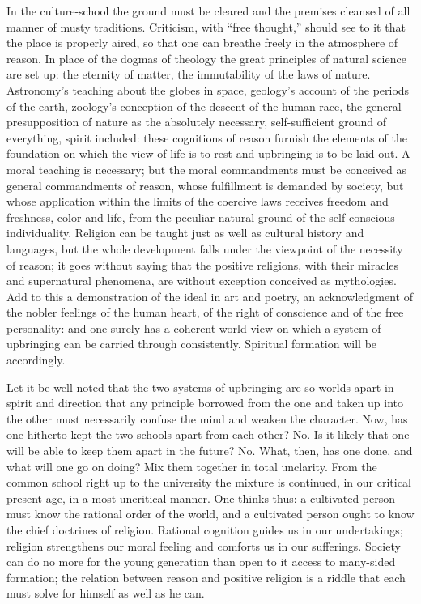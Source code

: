 \documentclass[12pt,a4paper,openany]{book}
\newcommand{\opage}[1]{\marginnote{\footnotesize\textit{[#1]}}}
\begin{document}
In the culture-school the ground must be cleared and the premises
cleansed of all manner of musty traditions. Criticism, with ``free
thought,'' should see to it that the place is properly aired, so that one
can breathe freely in the atmosphere of reason. In place of the dogmas of
theology the great principles of natural science are set up: the
eternity of matter, the immutability of the laws of nature. Astronomy's
teaching about the globes in \opage{9}space, geology's account of the periods of
the earth, zoology's conception of the descent of the human race, the
general presupposition of nature as the absolutely necessary,
self-sufficient ground of everything, spirit included: these cognitions
of reason furnish the elements of the foundation on which the view of
life is to rest and upbringing is to be laid out. A moral teaching is
necessary; but the moral commandments must be conceived as general
commandments of reason, whose fulfillment is demanded by society, but
whose application within the limits of the coercive laws receives
freedom and freshness, color and life, from the peculiar natural ground
of the self-conscious individuality. Religion can be taught just as well
as cultural history and languages, but the whole development falls under
the viewpoint of the necessity of reason; it goes without saying that the
positive religions, with their miracles and supernatural phenomena, are
without exception conceived as mythologies. Add to this a demonstration
of the ideal in art and poetry, an acknowledgment of the nobler feelings
of the human heart, of the right of conscience and of the free
personality: and one surely has a coherent world-view on which a system
of upbringing can be carried through consistently. Spiritual formation
will be accordingly.

Let it be well noted that the two systems of upbringing are so worlds
apart in spirit and direction that any principle borrowed from the one
and taken up into the other must necessarily confuse the mind and weaken
the character. Now, has one hitherto kept the two schools apart from each
other? No. Is it likely that one will be able to keep them apart in the
future? No. What, then, has one done, and what will one \opage{10}go on doing? Mix
them together in total unclarity. From the common school right up to the
university the mixture is continued, in our critical present age, in a
most uncritical manner. One thinks thus: a cultivated person must know
the rational order of the world, and a cultivated person ought to know
the chief doctrines of religion. Rational cognition guides us in our
undertakings; religion strengthens our moral feeling and comforts us in
our sufferings. Society can do no more for the young generation than open
to it access to many-sided formation; the relation between reason and
positive religion is a riddle that each must solve for himself as well as
he can.
\end{document}
